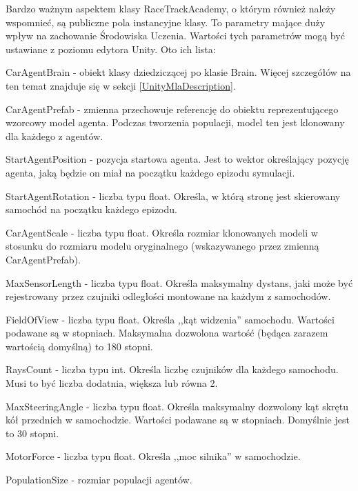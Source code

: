 Bardzo ważnym aspektem klasy RaceTrackAcademy, o którym również należy wspomnieć, są publiczne pola instancyjne klasy. 
To parametry mające duży wpływ na zachowanie Środowiska Uczenia. Wartości tych parametrów mogą być ustawiane z poziomu edytora Unity.
Oto ich lista:
\begin{itemize*}
\item CarAgentBrain - obiekt klasy dziedziczącej po klasie Brain. Więcej szczegółów na ten temat znajduje się w sekcji \ref{UnityMlaDescription}.
\item CarAgentPrefab - zmienna przechowuje referencję do obiektu reprezentującego wzorcowy model agenta. Podczas tworzenia populacji, model ten jest klonowany dla każdego z agentów.
\item StartAgentPosition - pozycja startowa agenta. Jest to wektor określający pozycję agenta, jaką będzie on miał na początku każdego epizodu symulacji.
\item StartAgentRotation - liczba typu float. Określa, w którą stronę jest skierowany samochód na początku każdego epizodu.
\item CarAgentScale - liczba typu float. Określa rozmiar klonowanych modeli w stosunku do rozmiaru modelu oryginalnego (wskazywanego przez zmienną CarAgentPrefab).
\item MaxSensorLength - liczba typu float. Określa maksymalny dystans, jaki może być rejestrowany przez czujniki odległości montowane na każdym z samochodów.
\item FieldOfView - liczba typu float. Określa ,,kąt widzenia'' samochodu. Wartości podawane są w stopniach. Maksymalna dozwolona wartość (będąca zarazem wartością domyślną) to 180 stopni.
\item RaysCount - liczba typu int. Określa liczbę czujników dla każdego samochodu. Musi to być liczba dodatnia, większa lub równa 2.
\item MaxSteeringAngle - liczba typu float. Określa maksymalny dozwolony kąt skrętu kół przednich w samochodzie. Wartości podawane są w stopniach. Domyślnie jest to 30 stopni.
\item MotorForce - liczba typu float. Określa ,,moc silnika'' w samochodzie.
\item PopulationSize - rozmiar populacji agentów.
\end{itemize*}

